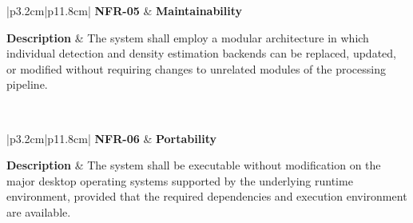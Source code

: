 
\begin{table}[H]
	\centering
	\renewcommand{\arraystretch}{1.25}
	\begin{tabular}{|p{3.2cm}|p{11.8cm}|}
		\hline
		\textbf{NFR-05} &
		\textbf{Maintainability} \\ \hline
		
		\textbf{Description} &
		The system shall employ a modular architecture in which individual detection and density estimation backends can be replaced, updated, or modified without requiring changes to unrelated modules of the processing pipeline. \\ \hline
		
		 \\ \hline
	\end{tabular}
	\caption{Non-functional requirement for system maintainability.}
	\label{tab:nfr05}
\end{table}



\begin{table}[H]
	\centering
	\renewcommand{\arraystretch}{1.25}
	\begin{tabular}{|p{3.2cm}|p{11.8cm}|}
		\hline
		\textbf{NFR-06} &
		\textbf{Portability} \\ \hline
		
		\textbf{Description} &
		The system shall be executable without modification on the major desktop operating systems supported by the underlying runtime environment, provided that the required dependencies and execution environment are available. \\ \hline
		
		 \\ \hline
	\end{tabular}
	\caption{Non-functional requirement for system portability.}
	\label{tab:nfr06}
\end{table}


